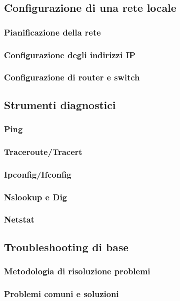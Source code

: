 \documentclass[12pt,a4paper]{article}
\begin{document}
\subsection{Configurazione di una rete locale}
\subsubsection{Pianificazione della rete}
\subsubsection{Configurazione degli indirizzi IP}
\subsubsection{Configurazione di router e switch}
\subsection{Strumenti diagnostici}
\subsubsection{Ping}
\subsubsection{Traceroute/Tracert}
\subsubsection{Ipconfig/Ifconfig}
\subsubsection{Nslookup e Dig}
\subsubsection{Netstat}
\subsection{Troubleshooting di base}
\subsubsection{Metodologia di risoluzione problemi}
\subsubsection{Problemi comuni e soluzioni}
\end{document}
